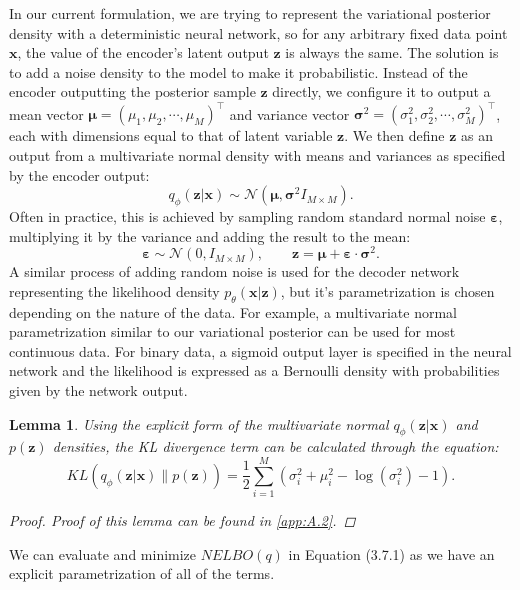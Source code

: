 \documentclass[honours,12pt, twoside]{unswthesis}
\newtheorem{lemma}[theorem]{Lemma}
\numberwithin{equation}{section}
\theoremstyle{definition}
\begin{document}
In our current formulation, we are trying to represent the variational posterior density with a deterministic neural network, so for any arbitrary fixed data point $\bm{x}$, the value of the encoder's latent output $\bm{z}$ is always the same. The solution is to add a noise density to the model to make it probabilistic. Instead of the encoder outputting the posterior sample $\bm{z}$ directly, we configure it to output a mean vector $\bm{\mu}=(\mu_1,\mu_2,\cdots,\mu_M)^\top$ and variance vector $\bm{\sigma}^2=(\sigma^2_1,\sigma^2_2,\cdots, \sigma^2_M)^\top$, each with dimensions equal to that of latent variable $\bm{z}$. We then define $\bm{z}$ as an output from a multivariate normal density with means and variances as specified by the encoder output:
\[q_\phi(\bm{z}|\bm{x})\sim \mathcal{N}(\bm{\mu},\bm{\sigma}^2I_{M\times M}).\]
Often in practice, this is achieved by sampling random standard normal noise $\bm{\varepsilon}$, multiplying it by the variance and adding the result to the mean:
\[\bm{\varepsilon}\sim \mathcal{N}(0,I_{M\times M}),\qquad \bm{z}=\bm{\mu}+\bm{\varepsilon}\cdot\bm{\sigma}^2.\]
A similar process of adding random noise is used for the decoder network representing the likelihood density $p_\theta(\bm{x}|\bm{z})$, but it's parametrization is chosen depending on the nature of the data. For example, a multivariate normal parametrization similar to our variational posterior can be used for most continuous data. For binary data, a sigmoid output layer is specified in the neural network and the likelihood is expressed as a Bernoulli density with probabilities given by the network output.
\begin{lemma}
Using the explicit form of the multivariate normal $q_\phi(\bm{z}|\bm{x})$ and $p(\bm{z})$ densities, the KL divergence term can be calculated through the equation:
\[KL(q_\phi(\bm{z}|\bm{x})\|p(\bm{z}))=\frac12 \sum_{i=1}^M\left(\sigma^2_i+\mu^2_i-\log(\sigma^2_i)-1\right).\]
\begin{proof}
Proof of this lemma can be found in \autoref{app:A.2}.
\end{proof}
\end{lemma}
We can evaluate and minimize $NELBO(q)$ in Equation (3.7.1) as we have an explicit parametrization of all of the terms.
\end{document}
